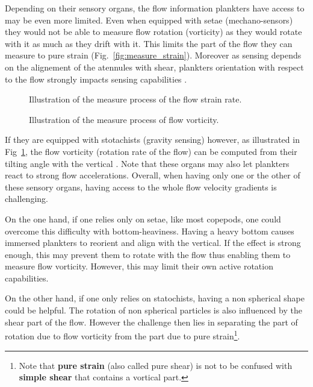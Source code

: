 Depending on their sensory organs, the flow information plankters have access to may be even more limited.
Even when equipped with setae (mechano-sensors) they would not be able to measure flow rotation (vorticity) as they would rotate with it as much as they drift with it.
This limits the part of the flow they can measure to pure strain (Fig.~\ref{fig:measure_strain}).
Moreover as sensing depends on the alignement of the atennules with shear, plankters orientation with respect to the flow strongly impacts sensing capabilities \citep{fields2010orientation}.
\begin{figure}
	\centering
	\begin{minipage}{0.5\textwidth}
	  	\centering
		\def\svgwidth{0.6\textwidth}
		
		\captionsetup{width=0.9\textwidth}
	  	\caption{Illustration of the measure process of the flow strain rate.}
	  	\label{fig:measure_strain}
	\end{minipage}%
	\begin{minipage}{0.5\textwidth}
		\centering
		\def\svgwidth{0.6\textwidth}
		
		\captionsetup{width=0.9\textwidth}
	  	\caption{Illustration of the measure process of flow vorticity.}
	  	\label{fig:measure_vorticity}
	\end{minipage}
\end{figure}
If they are equipped with stotachists (gravity sensing) however, as illustrated in Fig~\ref{fig:measure_vorticity}, the flow vorticity (rotation rate of the flow) can be computed from their tilting angle with the vertical \citep{fuchs2015directional}.
Note that these organs may also let plankters react to strong flow accelerations.
Overall, when having only one or the other of these sensory organs, having access to the whole flow velocity gradients is challenging.

On the one hand, if one relies only on setae, like most copepods, one could overcome this difficulty with bottom-heaviness.
Having a heavy bottom causes immersed plankters to reorient and align with the vertical.
If the effect is strong enough, this may prevent them to rotate with the flow thus enabling them to measure flow vorticity.
However, this may limit their own active rotation capabilities.

On the other hand, if one only relies on statochists, having a non spherical shape could be helpful.
The rotation of non spherical particles is also influenced by the shear part of the flow.
However the challenge then lies in separating the part of rotation due to flow vorticity from the part due to pure strain\footnote{Note that \textbf{pure strain} (also called pure shear) is not to be confused with \textbf{simple shear} that contains a vortical part.}.

